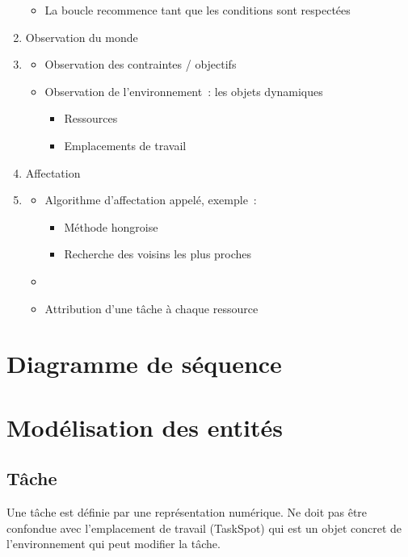 \begin{enumerate}
\begin{itemize}
	\item La boucle recommence tant que les conditions sont respectées
	\end{itemize}
%
\item Observation du monde
\item[]
	\begin{itemize}
	\setlength{\itemsep}{5pt}
	\item Observation des contraintes / objectifs
	\item Observation de l'environnement~: les objets dynamiques
		\begin{itemize}
		\setlength{\itemsep}{2pt}
		\item Ressources
		\item Emplacements de travail
		\end{itemize}
	\end{itemize}
%
\item Affectation
\item[]
	\begin{itemize}
	\setlength{\itemsep}{5pt}
	\item Algorithme d'affectation appelé, exemple~:
		\begin{itemize}
		\setlength{\itemsep}{2pt}
		\item Méthode hongroise
		\item Recherche des voisins les plus proches
		\end{itemize}
		\item %
	\item Attribution d'une tâche à chaque ressource
	\end{itemize}
\end{enumerate} %

%
\section{Diagramme de séquence}

%
\section{Modélisation des entités}

\subsection{Tâche}

Une tâche est définie par une représentation numérique. Ne doit pas être confondue avec l'emplacement de travail (TaskSpot) qui est un objet concret de l'environnement qui peut modifier la  tâche.

